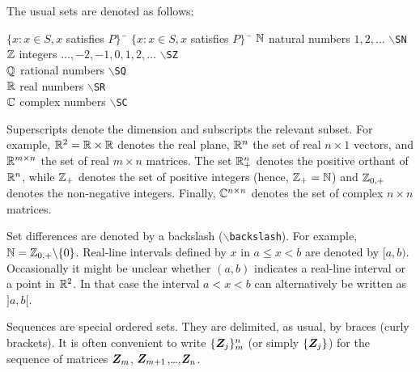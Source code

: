 \documentclass[11pt,dvips,a4paper]{article}
\newcommand{\hspacesymbols}%
   {$\{x: x \in S, x$ satisfies $P\}\;\;$} %
\newcommand{\type}[1]{{\tt$\backslash$#1}}
\begin{document}
The usual sets are denoted as follows:
\begin{tabbing}
\hspacesymbols \= \hspacesymbols\qquad\quad \=  \kill
$\mathbb{N}$ \> natural numbers $1,2,\dots$ \> \type{SN} \\
$\mathbb{Z}$ \> integers $\dots,-2,-1,0,1,2,\dots$ \> \type{SZ} \\
$\mathbb{Q}$ \> rational numbers \> \type{SQ} \\
$\mathbb{R}$ \> real numbers \> \type{SR} \\
$\mathbb{C}$ \> complex numbers \> \type{SC}
\end{tabbing}
Superscripts denote the dimension and subscripts the relevant subset.
For example,
$\mathbb{R}^2 = \mathbb{R}\times\mathbb{R}$ denotes the real plane,
$\mathbb{R}^n$ the set of real $n\times 1$ vectors, and
$\mathbb{R}^{m\times n}$ the set of real $m \times n$ matrices.
The set $\mathbb{R}^n_{+}$ denotes the positive orthant of $\mathbb{R}^n$, while
$\mathbb{Z}_+$ denotes the set of positive integers (hence, $\mathbb{Z}_+=\mathbb{N}$) and
$\mathbb{Z}_{0,+}$ denotes the non-negative integers.
Finally, $\mathbb{C}^{n\times n}$ denotes the set of complex $n\times n$ matrices.

Set differences are denoted by a backslash (\type{backslash}).
For example, $\mathbb{N}=\mathbb{Z}_{0,+}\backslash\{0\}$.
Real-line intervals defined by $x$ in $a\leq x<b$ are denoted by
$[a,b)$. Occasionally it might be unclear whether $(a,b)$ indicates a real-line
interval or a point in $\mathbb{R}^2$. In that case the interval
$a<x<b$ can alternatively be written as $]a,b[$.

Sequences are special ordered sets. They are delimited, as usual,
by braces (curly brackets). It is often convenient to write
$\{\bm Z_j\}_m^n$ (or simply $\{\bm Z_j\}$) for the sequence of matrices
$\bm Z_m$, $\bm Z_{m+1}$,\dots,$\bm Z_n$.
\end{document}
